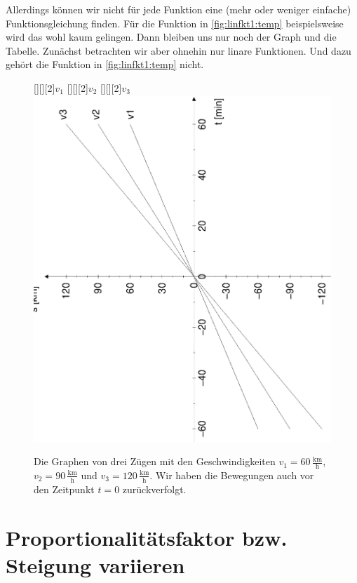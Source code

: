 \documentclass[%
11pt,%
twoside,%
titlepage,%
german,%
headsepline%
]{scrartcl}
\newcommand{\ufrac}[2]{\ensuremath{\,\frac{\mathrm{#1}}{\mathrm{#2}}}}
\begin{document}
Allerdings k\"onnen wir nicht f\"ur jede Funktion eine (mehr oder weniger einfache) Funktionsgleichung finden. F\"ur die Funktion in \ref{fig:linfkt1:temp} beispielsweise wird das wohl kaum gelingen. Dann bleiben uns nur noch der Graph und die Tabelle. Zun\"achst betrachten wir aber ohnehin nur linare Funktionen. Und dazu geh\"ort die Funktion in \ref{fig:linfkt1:temp} nicht.

\begin{figure}[t!]
\centering
{}[][][2]{$v_1$} [][][2]{$v_2$} [][][2]{$v_3$}
\includegraphics[angle=-90,width=0.9\columnwidth]{pictures/dreizug.eps}
\caption{Die Graphen von drei Z\"ugen mit den Geschwindigkeiten $v_1=60\ufrac{km}{h}$, $v_2=90\ufrac{km}{h}$ und $v_3=120\ufrac{km}{h}$. Wir haben die Bewegungen auch vor den Zeitpunkt $t=0$ zur\"uckverfolgt.}
\label{fig:linfkt1:dreizug}
\end{figure}

\section{Proportionalit\"atsfaktor bzw. Steigung variieren}
\label{linfkt1:steigung}
\end{document}
